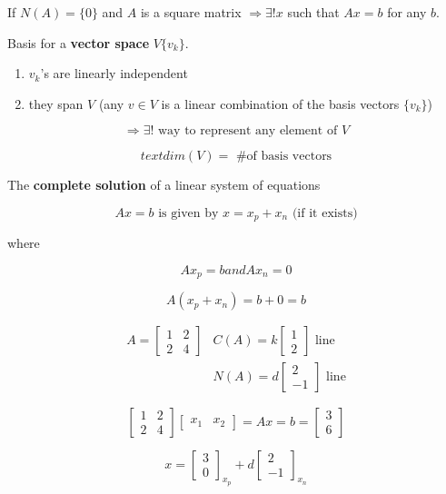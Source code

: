If $N(A) = \{0\}$ and $A$ is a square matrix $\Rightarrow \exists! x$ such that $Ax = b$ for any $b$.

Basis for a \textbf{vector space} $V \{v_k\}$.

\begin{enumerate}
	\item $v_k$'s are linearly independent
	\item they span $V$ (any $v \in V$ is a linear combination of the basis vectors $\{v_k\}$)
\end{enumerate}

\[
	\Rightarrow \exists! \text{ way to represent any element of } V
\]

\[
	text{dim}(V) = \text{ \# of basis vectors}
\]

The \textbf{complete solution} of a linear system of equations

\[
	 Ax=b \text{ is given by } x = x_p + x_n \text{ (if it exists)}
\]

where

\[
	Ax_p = b and Ax_n = 0
\]

\[
	A(x_p + x_n) = b + 0 = b
\]

\[
	\begin{matrix}
		A = \begin{bmatrix}
			1 & 2 \\ 2 & 4
		\end{bmatrix} &
		C(A) = k \begin{bmatrix}
			1 \\ 2
		\end{bmatrix} \text{ line}\\
		& N(A) = d \begin{bmatrix}
			2 \\ -1
		\end{bmatrix} \text{ line}
	\end{matrix}
\]

\[
	\begin{bmatrix}
		1 & 2 \\ 2 & 4
	\end{bmatrix}
	\begin{bmatrix}
		x_1 & x_2
	\end{bmatrix} = Ax  = b = \begin{bmatrix}
		3 \\ 6
	\end{bmatrix}
\]

\[
	x = \begin{bmatrix}
		3 \\ 0
	\end{bmatrix}_{x_{p}} + d \begin{bmatrix}
		2 \\ -1
	\end{bmatrix}_{x_{n}}
\]

